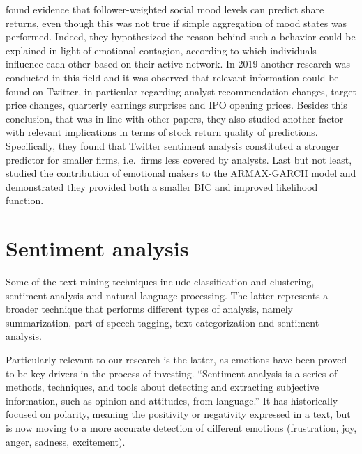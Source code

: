 \documentclass[
]{article}
\begin{document}
\autocite{noferUsingTwitterPredict_2015} found evidence that
follower-weighted social mood levels can predict share returns, even
though this was not true if simple aggregation of mood states was
performed. Indeed, they hypothesized the reason behind such a behavior
could be explained in light of emotional contagion, according to which
individuals influence each other based on their active network. In
2019\autocite{guInformationalRoleSocial2020a} another research was
conducted in this field and it was observed that relevant information
could be found on Twitter, in particular regarding analyst
recommendation changes, target price changes, quarterly earnings
surprises and IPO opening prices. Besides this conclusion, that was in
line with other papers, they also studied another factor with relevant
implications in terms of stock return quality of predictions.
Specifically, they found that Twitter sentiment analysis constituted a
stronger predictor for smaller firms, i.e.~firms less covered by
analysts. Last but not
least,\textcite{porshnevCouldEmotionalMarkers2016} studied the
contribution of emotional makers to the ARMAX-GARCH model and
demonstrated they provided both a smaller BIC and improved likelihood
function.

\hypertarget{sentiment-analysis}{%
\section{Sentiment analysis}\label{sentiment-analysis}}

Some of the text mining techniques include classification and
clustering, sentiment analysis and natural language processing. The
latter represents a broader technique that performs different types of
analysis, namely summarization, part of speech tagging, text
categorization and sentiment analysis.

Particularly relevant to our research is the latter, as emotions have
been proved to be key drivers in the process of investing. ``Sentiment
analysis is a series of methods, techniques, and tools about detecting
and extracting subjective information, such as opinion and attitudes,
from language.''\autocite{mantylaEvolutionSentimentAnalysis2018} It has
historically focused on polarity, meaning the positivity or negativity
expressed in a text, but is now moving to a more accurate detection of
different emotions (frustration, joy, anger, sadness, excitement).
\end{document}
